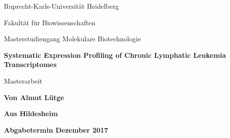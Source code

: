 
\begin{titlepage}
	\centering
	{\normalsize Ruprecht-Karls-Universität Heidelberg \par}
	\vspace{0.25cm}
	{\normalsize Fakultät für Biowissenschaften \par}
	\vspace{0.25cm}
	{\normalsize Masterstudiengang Molekulare Biotechnologie \par}
	\vspace{3.5cm}
	{\LARGE \bfseries Systematic Expression Profiling of Chronic Lymphatic Leukemia Transcriptomes \par}
	\vspace{5cm}
	{\normalsize Masterarbeit \par}
	\vspace{4cm}
	{\normalsize\textbf{ Von Almut Lütge} \par}
	\vspace{0.25cm}
	{\normalsize\textbf{Aus Hildesheim} \par}
	\vspace{0.5cm}
	{\normalsize\textbf{Abgabetermin Dezember 2017}}
\end{titlepage}


\cleardoublepage

